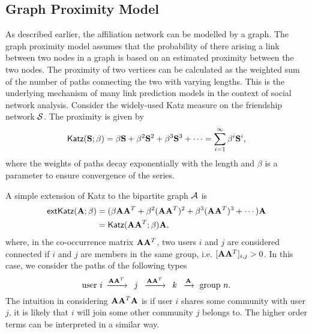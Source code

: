 \subsection{Graph Proximity Model}
\label{Graph Proximity Model}
As described earlier, the affiliation network can be modelled by a graph. The graph proximity model assumes that the probability of there arising a link between two nodes in a graph is based on an estimated proximity between the two nodes. The proximity of two vertices can be calculated as the weighted sum of the number of paths connecting the two with varying lengths. This is the underlying mechanism of many link prediction models in the context of social network analysis. Consider the widely-used \textsf{Katz} measure \cite{katz53,KleinbergLinkPred} on the friendship network $\mathcal{S}$. The proximity is given by
\[
\textsf{Katz}(\mathbf{S}; \beta) = \beta \mathbf{S} + \beta^2 \mathbf{S}^2 + \beta^3 \mathbf{S}^3 + \cdots = \sum_{i=1}^\infty \beta^i \mathbf{S}^i,
\]
where the weights of paths decay exponentially with the length and $\beta$ is a parameter to ensure convergence of the series. 

A simple extension of \textsf{Katz} to the bipartite graph $\mathcal{A}$ is
\begin{align}
\textsf{extKatz}(\mathbf{A}; \beta)  & = (\beta \mathbf{A}\mathbf{A}^T + \beta^2 (\mathbf{A}\mathbf{A}^T)^2 + \beta^3 (\mathbf{A}\mathbf{A}^T)^3 + \cdots) \mathbf{A} \nonumber \\
\hspace{-6pt} &=  \textsf{Katz}(\mathbf{A}\mathbf{A}^T;\beta) \mathbf{A},
\label{e:extKatz}
\end{align}
where, in the co-occurrence matrix $\mathbf{A}\mathbf{A}^T$, two users $i$ and $j$ are considered connected if $i$ and $j$ are members in the same group, i.e. $[\mathbf{A}\mathbf{A}^T]_{i,j} > 0$. In this case, we consider the paths of the following types
\[
\text{user $i$} \, \xrightarrow{\mathbf{A}\mathbf{A}^T}\, \text{ $j$ } \, \xrightarrow{\mathbf{A}\mathbf{A}^T}\, \text{ $k$ } \,  \xrightarrow{\mathbf{A}} \text{ group $n$.}
\]
The intuition in considering $\mathbf{A}\mathbf{A}^T\mathbf{A}$ is if user $i$ shares some community with user $j$, it is likely that $i$ will join some other community $j$ belongs to. The higher order terms can be interpreted in a similar way.

